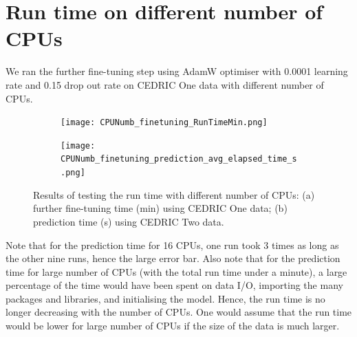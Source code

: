 \documentclass[a4paper,12pt]{article}
\newcommand{\figwidthhh}{0.45\textwidth}
\newcommand{\inghamOne}{CEDRIC One\xspace}   %
\newcommand{\inghamTwo}{CEDRIC Two\xspace}  %
\begin{document}
\newpage
\section{Run time on different number of CPUs}

We ran the further fine-tuning step using AdamW optimiser with 0.0001 learning rate and 0.15 drop out rate on \inghamOne data with different number of CPUs.

\begin{figure}[h!]
	\begin{center}
		\begin{subfigure}[b]{\figwidthhh}
			\caption{} 
			\texttt{[image: CPUNumb\_finetuning\_RunTimeMin.png]}
		\end{subfigure}
		\hfill
		\begin{subfigure}[b]{\figwidthhh}
			\caption{}
			\texttt{[image: CPUNumb\_finetuning\_prediction\_avg\_elapsed\_time\_s.png]}
		\end{subfigure}
	\end{center}                                                                
	\caption{Results of testing the run time with different number of CPUs: (a) further fine-tuning time (min) using \inghamOne data; (b) prediction time (s) using \inghamTwo data.
	}
\end{figure}

Note that for the prediction time for 16 CPUs, one run took 3 times as long as the other nine runs, hence the large error bar. Also note that for the prediction time for large number of CPUs (with the total run time under a minute), a large percentage of the time would have been spent on data I/O, importing the many packages and libraries, and initialising the model. Hence, the run time is no longer decreasing with the number of CPUs. One would assume that the run time would be lower for large number of CPUs if the size of the data is much larger. 


%
%


\end{document}
